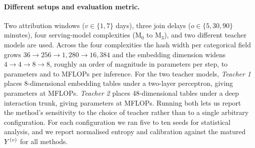 
\paragraph{Different setups and evaluation metric.} Two attribution windows ($v\in\{1, 7\}$ days), three
join delays ($o\in\{5,30,90\}$ minutes), four serving-model complexities
($\mathrm{M}_0$ to $\mathrm{M}_3$), and two different teacher models are used. Across the four
complexities the hash width per categorical field grows $36 \to 256 \to 1{,}280 \to 16{,}384$
and the embedding dimension widens $4 \to 4 \to 8 \to 8$, roughly an order of magnitude in
parameters per step, \capMin{} to \capMax{} parameters and \flopMin{} to \flopMax{} MFLOPs per
inference.
For the two teacher models, \emph{Teacher 1} places
8-dimensional embedding tables under a two-layer perceptron, giving \teacherSmallParams{}
parameters at \teacherSmallFlops{} MFLOPs. \emph{Teacher 2} places 48-dimensional tables under a
deep interaction trunk, giving \teacherParams{} parameters at \teacherFlops{} MFLOPs. Running
both lets us report the method's sensitivity to the choice of teacher rather than to a single
arbitrary configuration. For each configuration we ran five to ten seeds for statistical
analysis, and we report normalised entropy and calibration against the matured $Y^{(v)}$ for all
methods.


